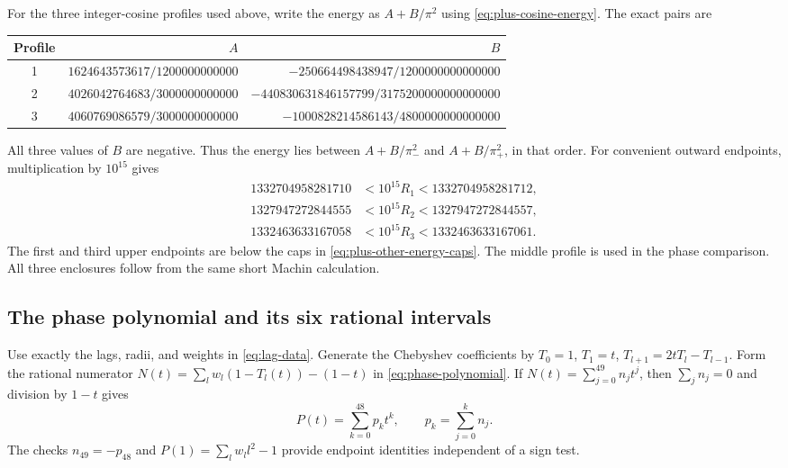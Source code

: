 \documentclass[11pt,reqno]{amsart}
\numberwithin{equation}{section}
\begin{document}
For the three integer-cosine profiles used above, write the energy as
$A+B/\pi^2$ using \eqref{eq:plus-cosine-energy}. The exact pairs are
\begin{center}
\small
\begin{tabular}{crr}
\toprule Profile&$A$&$B$\\\midrule
1&$1624643573617/1200000000000$&$-250664498438947/1200000000000000$\\
2&$4026042764683/3000000000000$&$-440830631846157799/3175200000000000000$\\
3&$4060769086579/3000000000000$&$-1000828214586143/4800000000000000$\\\bottomrule
\end{tabular}
\end{center}
All three values of $B$ are negative. Thus the energy lies between
$A+B/\pi_-^2$ and $A+B/\pi_+^2$, in that order. For convenient
outward endpoints, multiplication by $10^{15}$ gives
\begin{equation}
\begin{aligned}
 1332704958281710&<10^{15}R_1<1332704958281712,\\
 1327947272844555&<10^{15}R_2<1327947272844557,\\
 1332463633167058&<10^{15}R_3<1332463633167061.
\end{aligned}
 \label{eq:appendix-energy-enclosures}
\end{equation}
The first and third upper endpoints are below the caps in
\eqref{eq:plus-other-energy-caps}. The middle profile is used in the
phase comparison. All three enclosures follow from the same short
Machin calculation.

\subsection{The phase polynomial and its six rational intervals}

Use exactly the lags, radii, and weights in \eqref{eq:lag-data}.
Generate the Chebyshev coefficients by
$T_0=1$, $T_1=t$, $T_{l+1}=2tT_l-T_{l-1}$. Form the rational
numerator $N(t)=\sum_lw_l(1-T_l(t))-(1-t)$ in
\eqref{eq:phase-polynomial}. If $N(t)=\sum_{j=0}^{49}n_jt^j$,
then $\sum_jn_j=0$ and division by $1-t$ gives
\[
 P(t)=\sum_{k=0}^{48}p_kt^k,\qquad
 p_k=\sum_{j=0}^kn_j.
\]
The checks $n_{49}=-p_{48}$ and
$P(1)=\sum_lw_ll^2-1$ provide endpoint identities independent
of a sign test.
\end{document}
